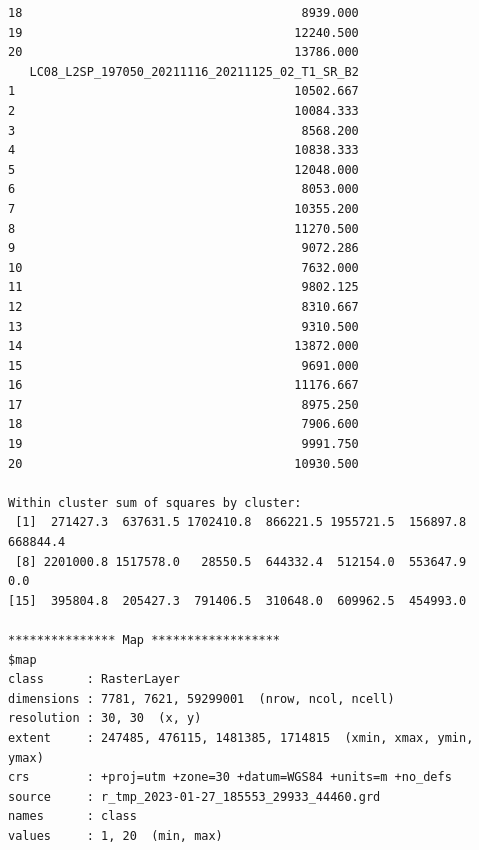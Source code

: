 \documentclass[12pt,a4paper,oneside]{article}
\begin{document}
\begin{scriptsize}
\begin{verbatim}
18                                       8939.000
19                                      12240.500
20                                      13786.000
   LC08_L2SP_197050_20211116_20211125_02_T1_SR_B2
1                                       10502.667
2                                       10084.333
3                                        8568.200
4                                       10838.333
5                                       12048.000
6                                        8053.000
7                                       10355.200
8                                       11270.500
9                                        9072.286
10                                       7632.000
11                                       9802.125
12                                       8310.667
13                                       9310.500
14                                      13872.000
15                                       9691.000
16                                      11176.667
17                                       8975.250
18                                       7906.600
19                                       9991.750
20                                      10930.500

Within cluster sum of squares by cluster:
 [1]  271427.3  637631.5 1702410.8  866221.5 1955721.5  156897.8  668844.4
 [8] 2201000.8 1517578.0   28550.5  644332.4  512154.0  553647.9       0.0
[15]  395804.8  205427.3  791406.5  310648.0  609962.5  454993.0

*************** Map ******************
$map
class      : RasterLayer 
dimensions : 7781, 7621, 59299001  (nrow, ncol, ncell)
resolution : 30, 30  (x, y)
extent     : 247485, 476115, 1481385, 1714815  (xmin, xmax, ymin, ymax)
crs        : +proj=utm +zone=30 +datum=WGS84 +units=m +no_defs 
source     : r_tmp_2023-01-27_185553_29933_44460.grd 
names      : class 
values     : 1, 20  (min, max)
\end{verbatim}
\end{scriptsize}
\end{document}
